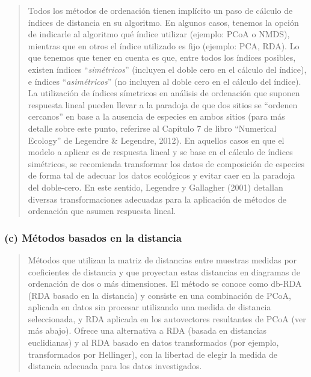 \documentclass[
]{book}
\begin{document}
\begin{quote}
Todos los métodos de ordenación tienen implícito un paso de cálculo de índices de distancia en su algoritmo. En algunos casos, tenemos la opción de indicarle al algoritmo qué índice utilizar (ejemplo: PCoA o NMDS), mientras que en otros el índice utilizado es fijo (ejemplo: PCA, RDA). Lo que tenemos que tener en cuenta es que, entre todos los índices posibles, existen índices ``\emph{simétricos}'' (incluyen el doble cero en el cálculo del índice), e índices ``\emph{asimétricos}'' (no incluyen al doble cero en el cálculo del índice). La utilización de índices símetricos en análisis de ordenación que suponen respuesta lineal pueden llevar a la paradoja de que dos sitios se ``ordenen cercanos'' en base a la ausencia de especies en ambos sitios (para más detalle sobre este punto, referirse al Capítulo 7 de libro ``Numerical Ecology'' de Legendre \& Legendre, 2012). En aquellos casos en que el modelo a aplicar es de respuesta lineal y se base en el cálculo de índices simétricos, se recomienda transformar los datos de composición de especies de forma tal de adecuar los datos ecológicos y evitar caer en la paradoja del doble-cero. En este sentido, Legendre y Gallagher (2001) detallan diversas transformaciones adecuadas para la aplicación de métodos de ordenación que asumen respuesta lineal.
\end{quote}

\hypertarget{c-muxe9todos-basados-en-la-distancia}{%
\subsubsection{(c) Métodos basados en la distancia}\label{c-muxe9todos-basados-en-la-distancia}}

\begin{quote}
Métodos que utilizan la matriz de distancias entre muestras medidas por coeficientes de distancia y que proyectan estas distancias en diagramas de ordenación de dos o más dimensiones. El método se conoce como db-RDA (RDA basado en la distancia) y consiste en una combinación de PCoA, aplicada en datos sin procesar utilizando una medida de distancia seleccionada, y RDA aplicada en los autovectores resultantes de PCoA (ver más abajo). Ofrece una alternativa a RDA (basada en distancias euclidianas) y al RDA basado en datos transformados (por ejemplo, transformados por Hellinger), con la libertad de elegir la medida de distancia adecuada para los datos investigados.
\end{quote}
\end{document}
